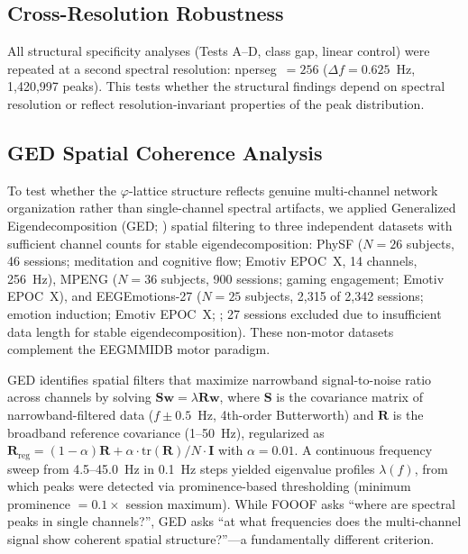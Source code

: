 \documentclass[11pt,a4paper]{article}
\newcommand{\phisym}{\varphi}
\begin{document}
\subsection{Cross-Resolution Robustness}
\label{sec:cross_resolution}

All structural specificity analyses (Tests A--D, class gap, linear control) were repeated at a second spectral resolution: nperseg~$= 256$ ($\Delta f = 0.625$~Hz, 1,420,997 peaks). This tests whether the structural findings depend on spectral resolution or reflect resolution-invariant properties of the peak distribution.

\subsection{GED Spatial Coherence Analysis}
\label{sec:ged_methods}

To test whether the $\phisym$-lattice structure reflects genuine multi-channel network organization rather than single-channel spectral artifacts, we applied Generalized Eigendecomposition (GED; \parencite{cohen2017ged}) spatial filtering to three independent datasets with sufficient channel counts for stable eigendecomposition: PhySF ($N = 26$ subjects, 46 sessions; meditation and cognitive flow; Emotiv EPOC~X, 14 channels, 256~Hz), MPENG ($N = 36$ subjects, 900 sessions; gaming engagement; Emotiv EPOC~X), and EEGEmotions-27 ($N = 25$ subjects, 2,315 of 2,342 sessions; emotion induction; Emotiv EPOC~X; \parencite{huy2025eeg}; 27 sessions excluded due to insufficient data length for stable eigendecomposition). These non-motor datasets complement the EEGMMIDB motor paradigm.

GED identifies spatial filters that maximize narrowband signal-to-noise ratio across channels by solving $\mathbf{S}\mathbf{w} = \lambda\mathbf{R}\mathbf{w}$, where $\mathbf{S}$ is the covariance matrix of narrowband-filtered data ($f \pm 0.5$~Hz, 4th-order Butterworth) and $\mathbf{R}$ is the broadband reference covariance (1--50~Hz), regularized as $\mathbf{R}_{\text{reg}} = (1-\alpha)\mathbf{R} + \alpha \cdot \text{tr}(\mathbf{R})/N \cdot \mathbf{I}$ with $\alpha = 0.01$. A continuous frequency sweep from 4.5--45.0~Hz in 0.1~Hz steps yielded eigenvalue profiles $\lambda(f)$, from which peaks were detected via prominence-based thresholding (minimum prominence $= 0.1 \times$ session maximum). While FOOOF asks ``where are spectral peaks in single channels?'', GED asks ``at what frequencies does the multi-channel signal show coherent spatial structure?''---a fundamentally different criterion.
\end{document}
